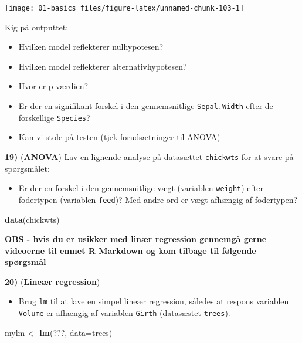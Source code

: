 \documentclass[
]{book}
\newenvironment{Shaded}{\begin{snugshade}}{\end{snugshade}}
\newcommand{\AttributeTok}[1]{\textcolor[rgb]{0.27,0.27,0.27}{#1}}
\newcommand{\FunctionTok}[1]{\textcolor[rgb]{0.27,0.27,0.27}{\textbf{#1}}}
\newcommand{\NormalTok}[1]{#1}
\newcommand{\OtherTok}[1]{\textcolor[rgb]{0.37,0.37,0.37}{#1}}
\providecommand{\tightlist}{%
  \setlength{\itemsep}{0pt}\setlength{\parskip}{0pt}}
\begin{document}
\begin{center}\texttt{[image: 01-basics\_files/figure-latex/unnamed-chunk-103-1]} \end{center}

Kig på outputtet:

\begin{itemize}
\tightlist
\item
  Hvilken model reflekterer nulhypotesen?
\item
  Hvilken model reflekterer alternativhypotesen?
\item
  Hvor er p-værdien?
\item
  Er der en signifikant forskel i den gennemsnitlige \texttt{Sepal.Width} efter de forskellige \texttt{Species}?
\item
  Kan vi stole på testen (tjek forudsætninger til ANOVA)
\end{itemize}

\textbf{19)} (\textbf{ANOVA}) Lav en lignende analyse på datasættet \texttt{chickwts} for at svare på spørgsmålet:

\begin{itemize}
\tightlist
\item
  Er der en forskel i den gennemsnitlige vægt (variablen \texttt{weight}) efter fodertypen (variablen \texttt{feed})? Med andre ord er vægt afhængig af fodertypen?
\end{itemize}

\begin{Shaded}
\begin{Highlighting}[]
\FunctionTok{data}\NormalTok{(chickwts)}
\end{Highlighting}
\end{Shaded}

\textbf{OBS - hvis du er usikker med linær regression gennemgå gerne videoerne til emnet R Markdown og kom tilbage til følgende spørgsmål}

\textbf{20)} (\textbf{Lineær regression})

\begin{itemize}
\tightlist
\item
  Brug \texttt{lm} til at lave en simpel lineær regression, således at respons variablen \texttt{Volume} er afhængig af variablen \texttt{Girth} (datasæstet \texttt{trees}).
\end{itemize}

\begin{Shaded}
\begin{Highlighting}[]
\NormalTok{mylm }\OtherTok{\textless{}{-}} \FunctionTok{lm}\NormalTok{(???, }\AttributeTok{data=}\NormalTok{trees) }
\end{Highlighting}
\end{Shaded}
\end{document}
